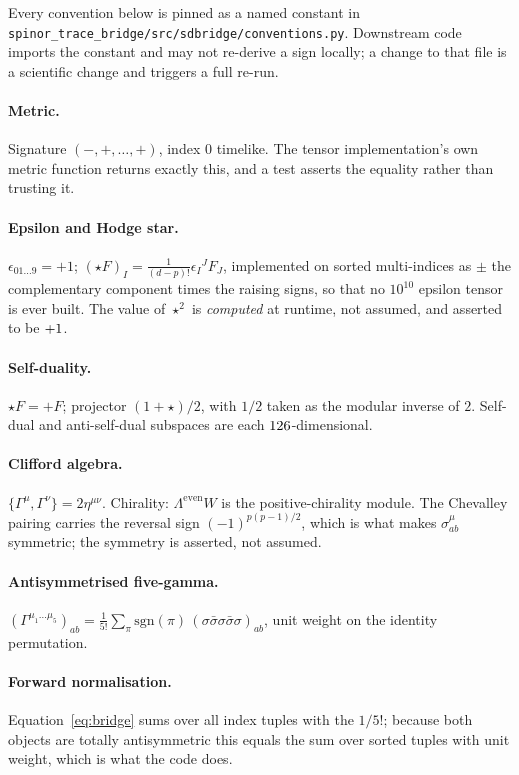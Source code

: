 Every convention below is pinned as a named constant in
\texttt{spinor\_trace\_bridge/src/sdbridge/conventions.py}. Downstream code
imports the constant and may not re-derive a sign locally; a change to that file
is a scientific change and triggers a full re-run.

\paragraph{Metric.} Signature $(-,+,\dots,+)$, index $0$ timelike. The tensor
implementation's own metric function returns exactly this, and a test asserts the
equality rather than trusting it.

\paragraph{Epsilon and Hodge star.} $\epsilon_{01\ldots 9}=+1$;
$(\star F)_I = \frac{1}{(d-p)!}\epsilon_I{}^J F_J$, implemented on sorted
multi-indices as $\pm$ the complementary component times the raising signs, so
that no $10^{10}$ epsilon tensor is ever built. The value of $\star^2$ is
\emph{computed} at runtime, not assumed, and asserted to be $+1$.

\paragraph{Self-duality.} $\star F = +F$; projector $(1+\star)/2$, with $1/2$
taken as the modular inverse of $2$. Self-dual and anti-self-dual subspaces are
each $126$-dimensional.

\paragraph{Clifford algebra.} $\{\Gamma^\mu,\Gamma^\nu\}=2\eta^{\mu\nu}$.
Chirality: $\Lambda^{\mathrm{even}}W$ is the positive-chirality module. The
Chevalley pairing carries the reversal sign $(-1)^{p(p-1)/2}$, which is what
makes $\sigma^\mu_{ab}$ symmetric; the symmetry is asserted, not assumed.

\paragraph{Antisymmetrised five-gamma.}
$(\Gamma^{\mu_1\ldots\mu_5})_{ab} = \frac{1}{5!}\sum_{\pi}\mathrm{sgn}(\pi)\,
(\sigma\bar\sigma\sigma\bar\sigma\sigma)_{ab}$, unit weight on the identity
permutation.

\paragraph{Forward normalisation.} Equation~\eqref{eq:bridge} sums over all index
tuples with the $1/5!$; because both objects are totally antisymmetric this
equals the sum over sorted tuples with unit weight, which is what the code does.

